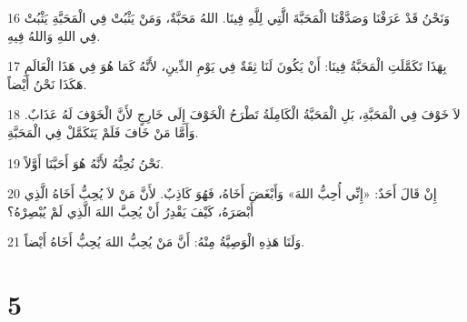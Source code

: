 \par 16 وَنَحْنُ قَدْ عَرَفْنَا وَصَدَّقْنَا الْمَحَبَّةَ الَّتِي لِلَّهِ فِينَا. اللهُ مَحَبَّةٌ، وَمَنْ يَثْبُتْ فِي الْمَحَبَّةِ يَثْبُتْ فِي اللهِ وَاللهُ فِيهِ.
\par 17 بِهَذَا تَكَمَّلَتِ الْمَحَبَّةُ فِينَا: أَنْ يَكُونَ لَنَا ثِقَةٌ فِي يَوْمِ الدِّينِ، لأَنَّهُ كَمَا هُوَ فِي هَذَا الْعَالَمِ هَكَذَا نَحْنُ أَيْضاً.
\par 18 لاَ خَوْفَ فِي الْمَحَبَّةِ، بَلِ الْمَحَبَّةُ الْكَامِلَةُ تَطْرَحُ الْخَوْفَ إِلَى خَارِجٍ لأَنَّ الْخَوْفَ لَهُ عَذَابٌ. وَأَمَّا مَنْ خَافَ فَلَمْ يَتَكَمَّلْ فِي الْمَحَبَّةِ.
\par 19 نَحْنُ نُحِبُّهُ لأَنَّهُ هُوَ أَحَبَّنَا أَوَّلاً.
\par 20 إِنْ قَالَ أَحَدٌ: «إِنِّي أُحِبُّ اللهَ» وَأَبْغَضَ أَخَاهُ، فَهُوَ كَاذِبٌ. لأَنَّ مَنْ لاَ يُحِبُّ أَخَاهُ الَّذِي أَبْصَرَهُ، كَيْفَ يَقْدِرُ أَنْ يُحِبَّ اللهَ الَّذِي لَمْ يُبْصِرْهُ؟
\par 21 وَلَنَا هَذِهِ الْوَصِيَّةُ مِنْهُ: أَنَّ مَنْ يُحِبُّ اللهَ يُحِبُّ أَخَاهُ أَيْضاً.

\chapter{5}

